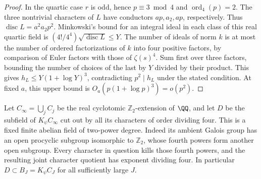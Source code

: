 \documentclass[a4paper,11pt]{article}
\theoremstyle{definition}
\theoremstyle{remark}
\newcommand{\ZZ}{\mathbb Z}\newcommand{\ord}{\operatorname{ord}}
\numberwithin{equation}{section}
\begin{document}
\begin{proof}
In the quartic case \(r\) is odd, hence \(p\equiv3\bmod4\) and
\(\operatorname{ord}_4(p)=2\). The three nontrivial characters
of \(L\) have conductors \(ap,a_2,ap\), respectively. Thus
\(\operatorname{disc}L=a^2a_2p^2\). Minkowski's bound for an
integral ideal in each class of this real quartic field is
\((4!/4^4)\sqrt{\operatorname{disc}L}\le Y\). The number of
ideals of norm \(k\) is at most the number of ordered
factorizations of \(k\) into four positive factors, by comparison
of Euler factors with those of \(\zeta(s)^4\). Sum first over
three factors, bounding the number of choices of the last by
\(Y\) divided by their product. This gives
\(h_L\le Y(1+\log Y)^3\), contradicting \(p^2\mid h_L\) under
the stated condition. At fixed \(a\), this upper bound is
\(O_a(p(1+\log p)^3)=o(p^2)\).
\end{proof}

Let \(C_\infty=\bigcup_j C_j\) be the real cyclotomic
\(\ZZ_2\)-extension of \(\QQ\), and let \(D\) be the subfield of
\(K_\psi C_\infty\) cut out by all its characters of order
dividing four. This is a fixed finite abelian field of two-power
degree. Indeed its ambient Galois group has an open procyclic
subgroup isomorphic to \(\ZZ_2\), whose fourth powers form
another open subgroup. Every character in question kills those
fourth powers, and the resulting joint character quotient has
exponent dividing four. In particular \(D\subset B_J=K_\psi C_J\)
for all sufficiently large \(J\).
\end{document}
